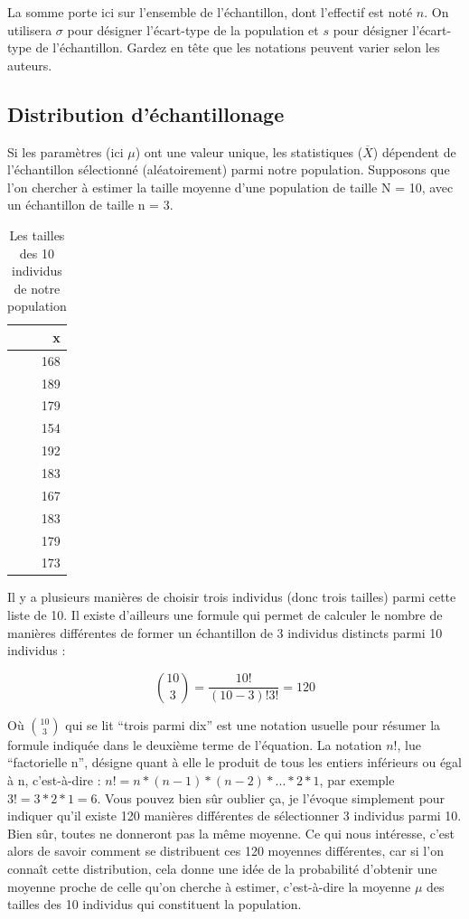 \documentclass[
  french,
]{book}
\begin{document}
La somme porte ici sur l'ensemble de l'échantillon, dont l'effectif est noté \(n\). On utilisera \(\sigma\) pour désigner l'écart-type de la population et \(s\) pour désigner l'écart-type de l'échantillon. Gardez en tête que les notations peuvent varier selon les auteurs.

\hypertarget{distribution-duxe9chantillonage}{%
\subsection{Distribution d'échantillonage}\label{distribution-duxe9chantillonage}}

Si les paramètres (ici \(\mu\)) ont une valeur unique, les statistiques (\(\overline{X}\)) dépendent de l'échantillon sélectionné (aléatoirement) parmi notre population. Supposons que l'on chercher à estimer la taille moyenne d'une population de taille N = 10, avec un échantillon de taille n = 3.

\begin{table}

\caption{\label{tab:unnamed-chunk-28}Les tailles des 10 individus de notre population}
\centering
\begin{tabular}[t]{r}
\hline
x\\
\hline
168\\
\hline
189\\
\hline
179\\
\hline
154\\
\hline
192\\
\hline
183\\
\hline
167\\
\hline
183\\
\hline
179\\
\hline
173\\
\hline
\end{tabular}
\end{table}

Il y a plusieurs manières de choisir trois individus (donc trois tailles) parmi cette liste de 10. Il existe d'ailleurs une formule qui permet de calculer le nombre de manières différentes de former un échantillon de 3 individus distincts parmi 10 individus :

\[{\binom{10}{3}} = \frac{10!}{(10-3)!3!} = 120\]

Où \(\binom{10}{3}\) qui se lit ``trois parmi dix'' est une notation usuelle pour résumer la formule indiquée dans le deuxième terme de l'équation. La notation \(n!\), lue ``factorielle n'', désigne quant à elle le produit de tous les entiers inférieurs ou égal à n, c'est-à-dire : \(n! = n*(n-1)*(n-2)*...*2*1\), par exemple \(3! = 3*2*1 = 6\). Vous pouvez bien sûr oublier ça, je l'évoque simplement pour indiquer qu'il existe 120 manières différentes de sélectionner 3 individus parmi 10. Bien sûr, toutes ne donneront pas la même moyenne. Ce qui nous intéresse, c'est alors de savoir comment se distribuent ces 120 moyennes différentes, car si l'on connaît cette distribution, cela donne une idée de la probabilité d'obtenir une moyenne proche de celle qu'on cherche à estimer, c'est-à-dire la moyenne \(\mu\) des tailles des 10 individus qui constituent la population.
\end{document}
